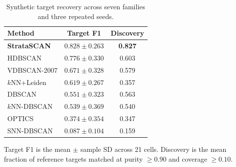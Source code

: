 \begin{table}[t]
\centering
\caption{Synthetic target recovery across seven families and three repeated seeds.}
\label{tab:synthetic-panel}
\setlength{\tabcolsep}{4.2pt}
\begin{tabular}{lcc}
\toprule
Method & Target F1 & Discovery \\
\midrule
\textbf{StrataSCAN} & \textbf{$0.828\pm0.263$} & \textbf{0.827} \\
HDBSCAN & $0.776\pm0.330$ & 0.603 \\
VDBSCAN-2007 & $0.671\pm0.328$ & 0.579 \\
$k$NN+Leiden & $0.619\pm0.267$ & 0.357 \\
DBSCAN & $0.551\pm0.323$ & 0.563 \\
$k$NN-DBSCAN & $0.539\pm0.369$ & 0.540 \\
OPTICS & $0.374\pm0.354$ & 0.347 \\
SNN-DBSCAN & $0.087\pm0.104$ & 0.159 \\
\bottomrule
\end{tabular}
\begin{minipage}{0.98\columnwidth}\footnotesize Target F1 is the mean $\pm$ sample SD across 21 cells. Discovery is the mean fraction of reference targets matched at purity $\geq0.90$ and coverage $\geq0.10$.\end{minipage}
\end{table}

